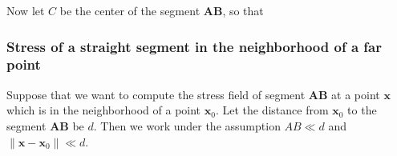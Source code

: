 Now let $C$ be the center of the segment $\bm A\bm B$, so that  


\subsubsection{Stress of a straight segment in the neighborhood of a far point}

Suppose that we want to compute the stress field of segment $\bm A\bm B$ at a point $\bm x$ which is in the neighborhood of a point $\bm x_0$. Let the distance from $\bm x_0$ to the segment $\bm A\bm B$ be $d$. Then we work under the assumption $AB\ll d$ and $\|\bm x-\bm x_0\|\ll d$. 




